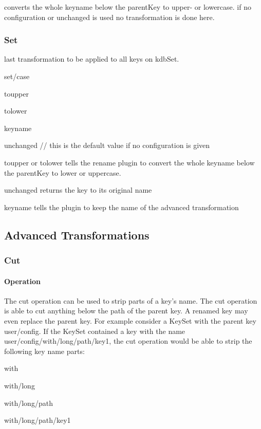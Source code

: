 converts the whole keyname below the parent\+Key to upper-\/ or lowercase. if no configuration or {\ttfamily unchanged} is used no transformation is done here.

\subsubsection*{Set}

last transformation to be applied to all keys on kdb\+Set.

{\ttfamily set/case}
\begin{DoxyItemize}
\item toupper
\item tolower
\item keyname
\item unchanged // this is the default value if no configuration is given
\end{DoxyItemize}

{\ttfamily toupper} or {\ttfamily tolower} tells the rename plugin to convert the whole keyname below the parent\+Key to lower or uppercase.

{\ttfamily unchanged} returns the key to its original name

{\ttfamily keyname} tells the plugin to keep the name of the advanced transformation

\subsection*{Advanced Transformations}

\subsubsection*{Cut}

\paragraph*{Operation}

The cut operation can be used to strip parts of a key’s name. The cut operation is able to cut anything below the path of the parent key. A renamed key may even replace the parent key. For example consider a Key\+Set with the parent key {\ttfamily user/config}. If the Key\+Set contained a key with the name {\ttfamily user/config/with/long/path/key1}, the cut operation would be able to strip the following key name parts\+:


\begin{DoxyItemize}
\item with
\item with/long
\item with/long/path
\item with/long/path/key1
\end{DoxyItemize}

